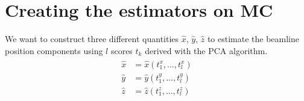 \section{Creating the estimators on MC}\label{sec:pca_estimators}

We want to construct three different quantities $\hat{x}$, $\hat{y}$, $\hat{z}$ to estimate the beamline position components using $l$ scores $t_k$ derived with the PCA algorithm.
\begin{align}
\begin{split}
    \hat{x} &= \hat{x}(t^x_1, \dots, t^x_l) \\
    \hat{y} &= \hat{y}(t^y_1, \dots, t^y_l) \\\label{x_hat}
    \hat{z} &= \hat{z}(t^z_1, \dots, t^z_l) 
    \end{split}
\end{align} 

